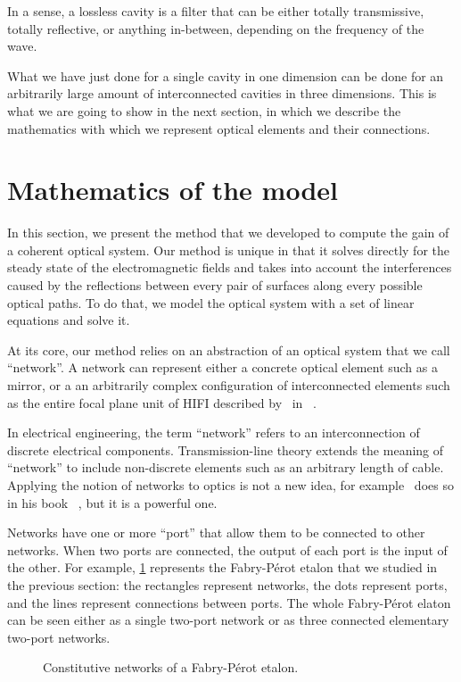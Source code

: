In a sense, a lossless cavity is a filter that can be either totally transmissive, totally reflective, or anything in-between, depending on the frequency of the wave.

What we have just done for a single cavity in one dimension can be done for an arbitrarily large amount of interconnected cavities in three dimensions.
This is what we are going to show in the next section, in which we describe the mathematics with which we represent optical elements and their connections.



\FloatBarrier
\section{Mathematics of the model}
\label{sec:chapter2_3}

In this section, we present the method that we developed to compute the gain of a coherent optical system.
Our method is unique in that it solves directly for the steady state of the electromagnetic fields and takes into account the interferences caused by the reflections between every pair of surfaces along every possible optical paths.
To do that, we model the optical system with a set of linear equations and solve it.

At its core, our method relies on an abstraction of an optical system that we call ``network''.
A network can represent either a concrete optical element such as a mirror, or a an arbitrarily complex configuration of interconnected elements such as the entire focal plane unit of HIFI described by~\citeauthor{jackson2002hifi} in ~\cite{jackson2002hifi}.

In electrical engineering, the term ``network'' refers to an interconnection of discrete electrical components.
Transmission-line theory extends the meaning of ``network'' to include non-discrete elements such as an arbitrary length of cable.
Applying the notion of networks to optics is not a new idea,
for example~\citeauthor{siegman1986lasers} does so in his book ~\cite{siegman1986lasers},
but it is a powerful one.

Networks have one or more ``port'' that allow them to be connected to other networks.
When two ports are connected, the output of each port is the input of the other.
For example, \cref{fig:fp_networks} represents the Fabry-Pérot etalon that we studied in the previous section: the rectangles represent networks, the dots represent ports, and the lines represent connections between ports.
The whole Fabry-Pérot elaton can be seen either as a single two-port network or as three connected elementary two-port networks.
\begin{figure}[hbtp]
    \centering
    
    \caption{Constitutive networks of a Fabry-Pérot etalon.}
    \label{fig:fp_networks}
\end{figure}

